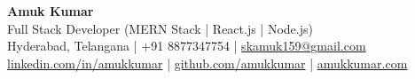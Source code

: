 \begin{center}
    {\Huge \textbf{Amuk Kumar}} \\[4pt]
    {\small Full Stack Developer (MERN Stack | React.js | Node.js)} \\[6pt]
    {\footnotesize
    Hyderabad, Telangana \;|\;
    +91 8877347754 \;|\;
    \href{mailto:skamuk159@gmail.com}{skamuk159@gmail.com} \\[2pt]
    \href{https://www.linkedin.com/in/amukkumar}{linkedin.com/in/amukkumar} \;|\;
    \href{https://github.com/amukkumar}{github.com/amukkumar} \;|\;
    \href{https://amukkumar.com}{amukkumar.com}
    }
\end{center}
